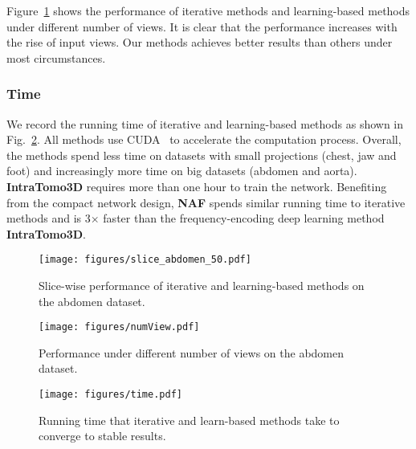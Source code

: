 \documentclass[runningheads]{llncs}
\begin{document}
Figure~\ref{fig:numView} shows the performance of iterative methods and learning-based methods under different number of views. It is clear that the performance increases with the rise of input views. Our methods achieves better results than others under most circumstances.


\subsubsection{Time} We record the running time of iterative and learning-based methods as shown in Fig.~\ref{fig:time}. All methods use CUDA~\cite{cuda} to accelerate the computation process. Overall, the methods spend less time on datasets with small projections (chest, jaw and foot) and increasingly more time on big datasets (abdomen and aorta). \textbf{IntraTomo3D} requires more than one hour to train the network. Benefiting from the compact network design, \textbf{NAF} spends similar running time to iterative methods and is 3$\times$ faster than the frequency-encoding deep learning method \textbf{IntraTomo3D}.


\begin{figure}[t]
\centering
\begin{minipage}[t]{0.47\linewidth}
\centering
\texttt{[image: figures/slice\_abdomen\_50.pdf]}
\caption{Slice-wise performance of iterative and learning-based methods on the abdomen dataset.}
 \label{fig:slice}
\end{minipage}
\hspace{4mm}
\begin{minipage}[t]{0.47\linewidth}
\centering
\texttt{[image: figures/numView.pdf]}
\caption{Performance under different number of views on the abdomen dataset.}
 \label{fig:numView}
\end{minipage}
\vspace{-1em}
\end{figure}

\begin{figure}[t]
    \centering
    \texttt{[image: figures/time.pdf]}
    \caption{Running time that iterative and learn-based methods take to converge to stable results.}
    \label{fig:time}
\end{figure}
\end{document}
